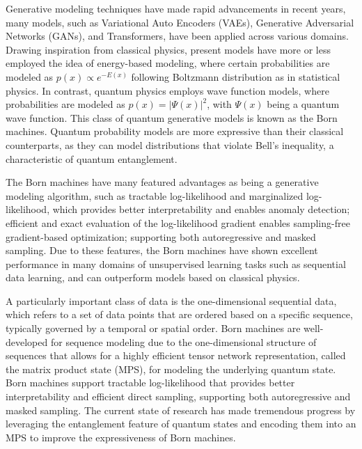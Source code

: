 \documentclass[aps,prb,twocolumn,superscriptaddress]{revtex4-2}
\begin{document}
Generative modeling techniques have made rapid advancements in recent years, many models, such as Variational Auto Encoders (VAEs)\cite{2013arXiv1312.6114K}, Generative Adversarial Networks (GANs)\cite{2014arXiv1406.2661G,2018PhRvA..98a2324D}, and Transformers\cite{2017arXiv170603762V}, have been applied across various domains. Drawing inspiration from classical physics, present models have more or less employed the idea of energy-based modeling, where certain probabilities are modeled as $p(x)\propto e^{-E(x)}$ following Boltzmann distribution as in statistical physics\cite{ackley1985learning,salakhutdinov2015learning}. In contrast, quantum physics employs wave function models, where probabilities are modeled as $p(x)=|\Psi(x)|^2$, with $\Psi(x)$ being a quantum wave function. This class of quantum generative models is known as the Born machines\cite{PhysRevX.8.031012, 2022PhRvA.106b2612K, 2021arXiv211205326M}. Quantum probability models are more expressive than their classical counterparts, as they can model distributions that violate Bell’s inequality, a characteristic of quantum entanglement\cite{trueblood2012quantum,haven2016quantum}. 

The Born machines have many featured advantages as being a generative modeling algorithm, such as tractable log-likelihood and marginalized log-likelihood, which provides better interpretability and enables anomaly detection; efficient and exact evaluation of the log-likelihood gradient enables sampling-free gradient-based optimization; supporting both autoregressive and masked sampling. Due to these features, the Born machines have shown excellent performance in many domains of unsupervised learning tasks such as sequential data learning, and can outperform models based on classical physics\cite{2018Entrp..20..583C,2018arXiv180404168L}.

A particularly important class of data is the one-dimensional sequential data, which refers to a set of data points that are ordered based on a specific sequence, typically governed by a temporal or spatial order. Born machines are well-developed for sequence modeling due to the one-dimensional structure of sequences that allows for a highly efficient tensor network representation, called the matrix product state (MPS), for modeling the underlying quantum state\cite{orus2019tensor,2019PhRvX...9c1041L,2021arXiv210612974L}. Born machines support tractable log-likelihood that provides better interpretability and efficient direct sampling, supporting both autoregressive and masked sampling. The current state of research has made tremendous progress by leveraging the entanglement feature of quantum states and encoding them into an MPS to improve the expressiveness of Born machines\cite{2018PhRvA..98a2324D,mitarai2018quantum,2018arXiv180404168L,gong2022born,2019arXiv190300556M}.
\end{document}
